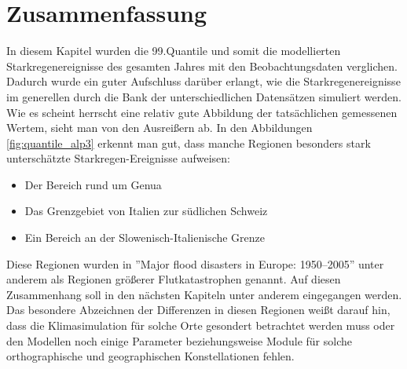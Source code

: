 \section{Zusammenfassung}
In diesem Kapitel wurden die 99.Quantile und somit die modellierten Starkregenereignisse des gesamten Jahres mit den Beobachtungsdaten verglichen. Dadurch wurde ein guter Aufschluss darüber erlangt, wie die Starkregenereignisse im generellen durch die Bank der unterschiedlichen Datensätzen simuliert werden. Wie es scheint herrscht eine relativ gute Abbildung der tatsächlichen gemessenen Wertem, sieht man von den Ausreißern ab. In den Abbildungen \ref{fig:quantile_alp3} erkennt man gut, dass manche Regionen besonders stark unterschätzte Starkregen-Ereignisse aufweisen: 
\begin{itemize}
	\item Der Bereich rund um Genua
	\item Das Grenzgebiet von Italien zur südlichen Schweiz
	\item Ein Bereich an der Slowenisch-Italienische Grenze
\end{itemize}
Diese Regionen wurden in ''Major flood disasters in Europe: 1950–2005'' \cite{barredo_major_2007} unter anderem als Regionen größerer Flutkatastrophen genannt. Auf diesen Zusammenhang soll in den nächsten Kapiteln unter anderem eingegangen werden. Das besondere Abzeichnen der Differenzen in diesen Regionen weißt darauf hin, dass die Klimasimulation für solche Orte gesondert betrachtet werden muss oder den Modellen noch einige Parameter beziehungsweise Module für solche orthographische und geographischen Konstellationen fehlen.